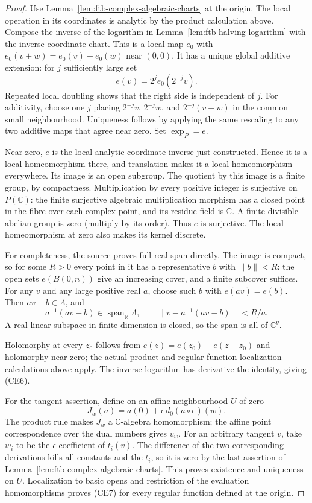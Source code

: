 \begin{proof}
Use Lemma~\ref{lem:ftb-complex-algebraic-charts} at the origin.
The local operation in its coordinates is analytic by the product
calculation above.  Compose the inverse of the logarithm in
Lemma~\ref{lem:ftb-halving-logarithm} with the inverse coordinate chart.
This is a local map \(e_0\) with
\(e_0(v+w)=e_0(v)+e_0(w)\) near \((0,0)\).
It has a unique global additive extension: for \(j\) sufficiently
large set
\[
                     e(v)=2^j e_0(2^{-j}v).                \tag{CE9}
\]
Repeated local doubling shows that the right side is independent of
\(j\).  For additivity, choose one \(j\) placing \(2^{-j}v\),
\(2^{-j}w\), and \(2^{-j}(v+w)\) in the common small neighbourhood.
Uniqueness follows by applying the same rescaling to any two additive
maps that agree near zero.  Set \(\exp_P=e\).

Near zero, \(e\) is the local analytic coordinate inverse just
constructed.  Hence it is a local homeomorphism there, and translation
makes it a local homeomorphism everywhere.  Its image is an open
subgroup.  The quotient by this image is a finite group, by compactness.
Multiplication by every positive integer is surjective on \(P(\mathbb C)\):
the finite surjective algebraic multiplication morphism has a closed
point in the fibre over each complex point, and its residue field is
\(\mathbb C\).  A finite divisible abelian group is zero (multiply by
its order).  Thus \(e\) is surjective.  The local homeomorphism at zero
also makes its kernel discrete.

For completeness, the source proves full real span directly.
The image is compact, so for some \(R>0\) every point in it has a
representative \(b\) with \(\|b\|<R\): the open sets \(e(B(0,n))\)
give an increasing cover, and a finite subcover suffices.
For any \(v\) and any large positive real \(a\), choose such \(b\)
with \(e(av)=e(b)\).  Then \(av-b\in\Lambda\), and
\[
             a^{-1}(av-b)\in\operatorname{span}_{\mathbb R}\Lambda,
             \qquad \|v-a^{-1}(av-b)\|<R/a .
\]
A real linear subspace in finite dimension is closed, so the span is
all of \(\mathbb C^g\).

Holomorphy at every \(z_0\) follows from
\(e(z)=e(z_0)+e(z-z_0)\) and holomorphy near zero; the actual product
and regular-function localization calculations above apply.
The inverse logarithm has derivative the identity, giving (CE6).

For the tangent assertion, define on an affine neighbourhood \(U\)
of zero
\[
 J_w(a)=a(0)+\epsilon\,d_0(a\circ e)(w).
\]
The product rule makes \(J_w\) a \(\mathbb C\)-algebra homomorphism;
the affine point correspondence over the dual numbers gives \(v_w\).
For an arbitrary tangent \(v\), take
\(w_i\) to be the \(\epsilon\)-coefficient of \(t_i(v)\).
The difference of the two corresponding derivations kills all
constants and the \(t_i\), so it is zero by the last assertion of
Lemma~\ref{lem:ftb-complex-algebraic-charts}.  This proves existence
and uniqueness on \(U\).  Localization to basic opens and restriction
of the evaluation homomorphisms proves (CE7) for every regular
function defined at the origin.


\end{proof}
